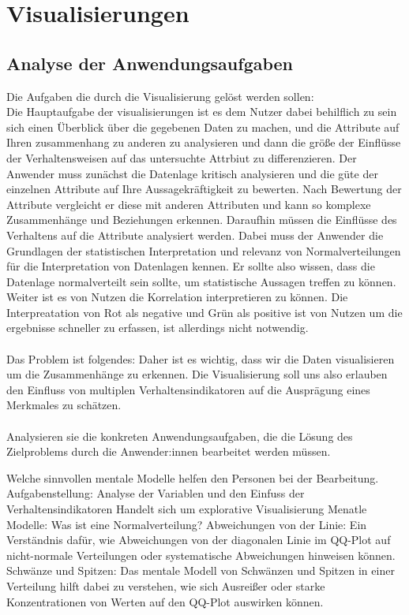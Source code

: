 \documentclass[usegeometry=true]{scrartcl}
\begin{document}
   
\newpage
\section{Visualisierungen}
\subsection{Analyse der Anwendungsaufgaben}
Die Aufgaben die durch die Visualisierung gelöst werden sollen: \\ 
 Die Hauptaufgabe der visualisierungen ist es dem Nutzer dabei behilflich zu sein sich 
einen Überblick über die gegebenen Daten zu machen, und die Attribute auf Ihren zusammenhang zu anderen
zu analysieren und dann die größe der Einflüsse der Verhaltensweisen auf das untersuchte Attrbiut zu differenzieren. 
Der Anwender muss zunächst die Datenlage kritisch analysieren und die güte der einzelnen Attribute auf Ihre Aussagekräftigkeit zu bewerten. 
Nach Bewertung der Attribute vergleicht er diese mit anderen Attributen und kann so komplexe Zusammenhänge und Beziehungen erkennen. 
Daraufhin müssen die Einflüsse des Verhaltens auf die Attribute analysiert werden.
Dabei muss der Anwender die Grundlagen der statistischen Interpretation und relevanz
von Normalverteilungen für die Interpretation von Datenlagen kennen. Er sollte also wissen, dass die Datenlage normalverteilt sein sollte, um statistische Aussagen treffen zu können.
Weiter ist es von Nutzen die Korrelation interpretieren zu können. 
Die Interpreatation von Rot als negative und Grün als positive ist von Nutzen um die ergebnisse schneller zu erfassen, ist allerdings nicht notwendig.
\\
\\
Das Problem ist folgendes: Daher ist es wichtig, 
 dass wir die Daten visualisieren um die Zusammenhänge zu erkennen.
Die Visualisierung soll uns also erlauben den Einfluss von multiplen Verhaltensindikatoren auf die Ausprägung eines Merkmales zu schätzen.
\\
\\
Analysieren sie die konkreten Anwendungsaufgaben, die die Lösung des Zielproblems durch die Anwender:innen bearbeitet werden müssen. 

Welche sinnvollen mentale Modelle helfen den Personen bei der Bearbeitung. 
Aufgabenstellung: Analyse der Variablen und den Einfuss der Verhaltensindikatoren
Handelt sich um explorative Visualisierung 
Menatle Modelle: Was ist eine Normalverteilung? 
Abweichungen von der Linie:
  Ein Verständnis dafür, wie Abweichungen von der diagonalen Linie im QQ-Plot auf nicht-normale Verteilungen oder systematische Abweichungen hinweisen können.
  Schwänze und Spitzen:
Das mentale Modell von Schwänzen und Spitzen in einer Verteilung hilft dabei zu verstehen, wie sich Ausreißer oder starke Konzentrationen von Werten auf den QQ-Plot auswirken können.
\\
\\
\end{document}
